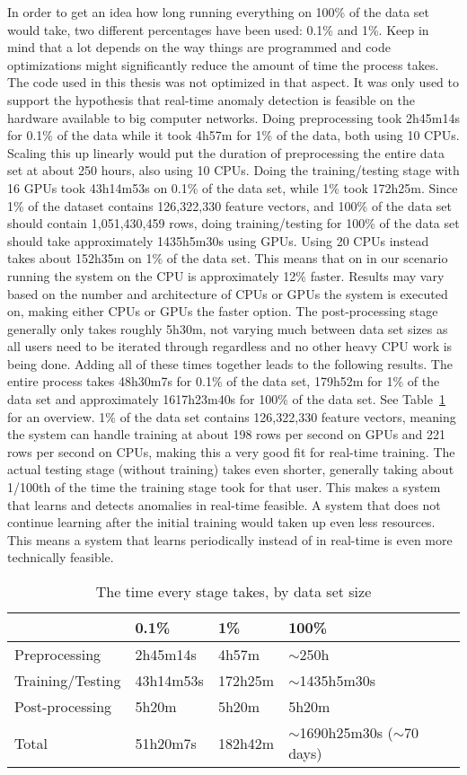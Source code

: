 In order to get an idea how long running everything on 100\% of the data set would take, two different percentages have been used: 0.1\% and 1\%. Keep in mind that a lot depends on the way things are programmed and code optimizations might significantly reduce the amount of time the process takes. The code used in this thesis was not optimized in that aspect. It was only used to support the hypothesis that real-time anomaly detection is feasible on the hardware available to big computer networks. Doing preprocessing took 2h45m14s for 0.1\% of the data while it took 4h57m for 1\% of the data, both using 10 CPUs. Scaling this up linearly would put the duration of preprocessing the entire data set at about 250 hours, also using 10 CPUs. Doing the training/testing stage with 16 GPUs took 43h14m53s on 0.1\% of the data set, while 1\% took 172h25m. Since 1\% of the dataset contains 126,322,330 feature vectors, and 100\% of the data set should contain 1,051,430,459 rows, doing training/testing for 100\% of the data set should take approximately 1435h5m30s using GPUs. Using 20 CPUs instead takes about 152h35m on 1\% of the data set. This means that on in our scenario running the system on the CPU is approximately 12\% faster. Results may vary based on the number and architecture of CPUs or GPUs the system is executed on, making either CPUs or GPUs the faster option. The post-processing stage generally only takes roughly 5h30m, not varying much between data set sizes as all users need to be iterated through regardless and no other heavy CPU work is being done. Adding all of these times together leads to the following results. The entire process takes 48h30m7s for 0.1\% of the data set, 179h52m for 1\% of the data set and approximately 1617h23m40s for 100\% of the data set. See Table~\ref{tab:times_taken} for an overview. 1\% of the data set contains 126,322,330 feature vectors, meaning the system can handle training at about 198 rows per second on GPUs and 221 rows per second on CPUs, making this a very good fit for real-time training. The actual testing stage (without training) takes even shorter, generally taking about 1/100th of the time the training stage took for that user. This makes a system that learns and detects anomalies in real-time feasible. A system that does not continue learning after the initial training would taken up even less resources. This means a system that learns periodically instead of in real-time is even more technically feasible.

\begin{table}[htbp]
	\centering
	\caption{The time every stage takes, by data set size}\label{tab:times_taken}
	\begin{tabular}{l|lll}
										  & 0.1\%     & 1\%     & 100\%             \\ \midrule
	Preprocessing    & 2h45m14s  & 4h57m   & \(\sim\)250h        \\
	Training/Testing & 43h14m53s & 172h25m & \(\sim\)1435h5m30s \\
	Post-processing      & 5h20m     & 5h20m   & 5h20m             \\
	Total            & 51h20m7s  & 182h42m & \(\sim\)1690h25m30s (\(\sim\)70 days)
	\end{tabular}
\end{table}